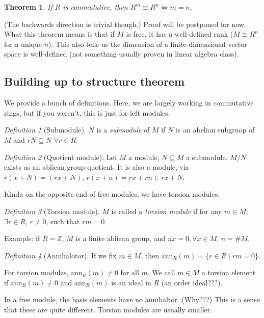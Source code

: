 \documentclass{article}
\theoremstyle{plain}
\newtheorem{theorem}{Theorem}
\theoremstyle{remark}
\newtheorem{definition}{Definition}
\newcommand{\Z}{{\mathbb Z}}
\begin{document}
\begin{theorem}
	If $R$ is commutative, then $R^m \cong R^n \iff m = n$.
\end{theorem}
(The backwards direction is trivial though.)
Proof will be postponed for now.
What this theorem means is that if $M$ is free, it has a well-defined rank
($M \cong R^n$ for a unique $n$).
This also tells us the dimension of a finite-dimensional vector space
is well-defined (not something usually proven in linear algebra class).

\subsection{Building up to structure theorem}
We provide a bunch of definitions.
Here, we are largely working in commutative rings,
but if you weren't, this is just for left modules.
\begin{definition}[Submodule]
	$N$ is a \emph{submodule} of $M$ if $N$ is an abelian subgruop of $M$
	and	$rN \subseteq N$ $\forall r \in R$.
\end{definition}
\begin{definition}[Quotient module]
	Let $M$ a module, $N \subseteq M$ a submodule.
	$M/N$ exists as an abliean group quotient.
	It is also a module, via $r(x + N) = (rx + N)$,
	$r(x + n) = rx + rn \in rx + N$.
\end{definition}

Kinda on the opposite end of free modules, we have torsion modules.
\begin{definition}[Torsion module]
	$M$ is called a \emph{torsion module} if for any $m \in M$,
	$\exists r \in R$, $r \neq 0$, such that $rm = 0$.
\end{definition}
Example: if $R = \Z$, $M$ is a finite abliean group,
and $nx = 0, \forall x \in M$, $n = \# M$.
\begin{definition}[Annihalotor]
	If we fix $m \in M$, then $\mathrm{ann}_R(m) = \{r \in R \mid rm = 0\}$.
\end{definition}
For torsion modules, $\mathrm{ann}_R(m) \neq 0$ for all $m$.
We call $m \in M$ a torsion element if $\mathrm{ann}_R(m) \neq 0$
and $\mathrm{ann}_R(m)$ is an ideal in $R$ (an order ideal???).

In a free module, the basis elements have no annihaltor.
(Why???) This is a sense that these are quite different.
Torsion modules are usually smaller.
\end{document}
